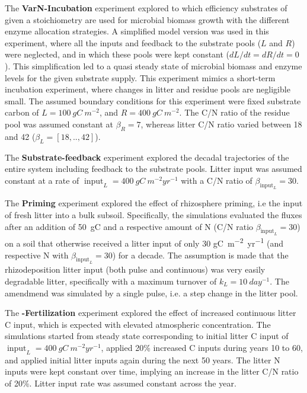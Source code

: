 The \textbf{VarN-Incubation} experiment explored to which efficiency substrates of
given a stoichiometry are used for microbial biomass growth with the different
enzyme allocation strategies. A simplified model version was used in this
experiment, where all the inputs and feedback to the substrate pools ($L$ and $R$)
were neglected, and in which these pools were
kept constant ($dL/dt = dR/dt = 0$). This simplification led to a quasi
steady state of microbial biomass and enzyme levels for the given substrate supply. This
experiment mimics a short-term incubation experiment, where changes in litter and
residue pools are negligible small. The assumed boundary conditions for this
experiment were fixed substrate carbon of $L=100~\unit{gC~m^{-2}}$, and $R=400~
\unit{gC~m^{-2}}$. The C/N ratio of the residue pool was assumed constant at
$\beta_R=7$, whereas litter C/N ratio varied between 18 and 42 ($\beta_L =
[18,..,42]$).

The \textbf{Substrate-feedback} experiment explored the decadal trajectories
of the entire system including feedback to the substrate pools. Litter input was
assumed constant at a rate of $\operatorname{input}_L =
400~\unit{gC~m^{-2}yr^{-1}}$ with a C/N ratio of $\beta_{\operatorname{input}_L} = 30$.

The \textbf{Priming} experiment explored the effect of rhizosphere priming, i.e
the input of fresh litter into a bulk subsoil. Specifically, the simulations
evaluated the fluxes after an addition of 50~\unit{g}C and a respective amount
of N (C/N ratio $\beta_{\operatorname{input}_L} = 30$) on a soil that otherwise
received a litter input of only 30 \unit{gC~m^{-2}yr^{-1}} (and respective N
with $\beta_{\operatorname{input}_L} = 30$) for a decade. The assumption is made
that the rhizodeposition litter input (both pulse and continuous) was very
easily degradable litter, specifically with a maximum turnover of $k_L =
10~\unit{day^{-1}}$. The amendmend was simulated by a single pulse, i.e. a step
change in the litter pool. 

The \textbf{-Fertilization} experiment explored the effect of
increased continuous litter C input, which is expected with elevated atmospheric
 concentration.
The simulations started from steady state corresponding to initial litter C
input of $\operatorname{input}_L = 400~\unit{gC~m^{-2}yr^{-1}}$, applied 20\%
increased C inputs during years 10 to 60, and applied initial litter inputs
again during the next 50 years. The litter N inputs were kept constant over
time, implying an increase in the litter C/N ratio of 20\%. Litter input rate
was assumed constant across the year.

